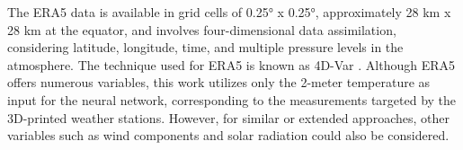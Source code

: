 The ERA5 data is available in grid cells of 0.25° x 0.25°, approximately 28 km x 28 km at the equator, and involves four-dimensional data assimilation, considering latitude, longitude, time, and multiple pressure levels in the atmosphere. The technique used for ERA5 is known as 4D-Var \cite{era5}. Although ERA5 offers numerous variables, this work utilizes only the 2-meter temperature as input for the neural network, corresponding to the measurements targeted by the 3D-printed weather stations. However, for similar or extended approaches, other variables such as wind components and solar radiation could also be considered.